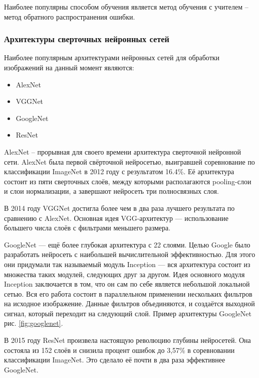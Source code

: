 \documentclass[a4paper,14pt]{article}
\begin{document}
	Наиболее популярны способом обучения является метод обучения с учителем -- метод обратного распространения ошибки.
	
	\subsubsection{Архитектуры сверточных нейронных сетей}
	
	Наиболее популярным архитектурами нейронных сетей для обработки изображений на данный момент являются:
	\begin{itemize}
		\item AlexNet
		\item VGGNet
		\item GoogleNet
		\item ResNet
	\end{itemize}
	
	AlexNet -- прорывная для своего времени архитектура сверточной нейронной сети.
	AlexNet была первой свёрточной нейросетью, выигравшей соревнование по классификации ImageNet в 2012 году с результатом 16.4\%.
	Её архитектура состоит из пяти сверточных слоёв, между которыми располагаются pooling-слои и слои нормализации, а завершают нейросеть три полносвязных слоя.
	
	В 2014 году VGGNet достигла более чем в два раза лучшего результата по сравнению с AlexNet.
	Основная идея VGG-архитектур — использование большего числа слоёв с фильтрами меньшего размера.
	
	GoogleNet — ещё более глубокая архитектура с 22 слоями.
	Целью Google было разработать нейросеть с наибольшей вычислительной эффективностью.
	Для этого они придумали так называемый модуль Inception — вся архитектура состоит из множества таких модулей, следующих друг за другом.
	Идея основного модуля Inception заключается в том, что он сам по себе является небольшой локальной сетью.
	Вся его работа состоит в параллельном применении нескольких фильтров на исходное изображение.
	Данные фильтров объединяются, и создаётся выходной сигнал, который переходит на следующий слой.
	Пример архитектуры GoogleNet рис. \ref{fig:googlenet}.
	
	В 2015 году ResNet произвела настоящую революцию глубины нейросетей.
	Она состояла из 152 слоёв и снизила процент ошибок до 3,57\% в соревновании классификации ImageNet.
	Это сделало её почти в два раза эффективнее GoogleNet.
	
\end{document}
